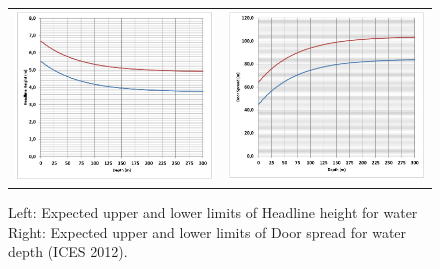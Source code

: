 \documentclass[a4paper 12pt]{article}
\numberwithin{equation}{section}
\begin{document}
\begin{appendices}
\begin{figure}[h!]
\begin{tabular}{ll}
\includegraphics[scale=0.5]{headlineHeight.jpg}
&
\includegraphics[scale=0.5]{doorspead.jpg}
\end{tabular}
\caption{Left: Expected upper and lower limits of Headline height for water %
Right: Expected upper and lower limits of Door spread for water depth (ICES 2012).}
\label{fig:test}
\end{figure}


\end{appendices}
\end{document}
